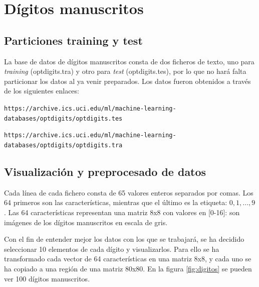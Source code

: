 \documentclass[12pt,spanish]{article} %
\begin{document}

\tableofcontents %

\newpage %

\pagestyle{fancy}


\section{Dígitos manuscritos}

\subsection{Particiones training y test}

La base de datos de dígitos manuscritos consta de dos ficheros de texto, uno para \textit{training} (optdigits.tra) y otro para \textit{test} (optdigits.tes), por lo que no hará falta particionar los datos al ya venir preparados. Los datos fueron obtenidos a través de los siguientes enlaces:

\noindent
{\small \texttt{https://archive.ics.uci.edu/ml/machine-learning-databases/optdigits/optdigits.tes}}

\noindent
{\small \texttt{https://archive.ics.uci.edu/ml/machine-learning-databases/optdigits/optdigits.tra}}

\subsection{Visualización y preprocesado de datos}

Cada línea de cada fichero consta de 65 valores enteros separados por comas. Los 64 primeros son las características, mientras que el último es la etiqueta: $0, 1, ..., 9$. Las 64 características representan una matriz 8x8 con valores en [0-16]: son imágenes de los dígitos manuscritos en escala de gris.

Con el fin de entender mejor los datos con los que se trabajará, se ha decidido seleccionar 10 elementos de cada dígito y visualizarlos. Para ello se ha transformado cada vector de 64 características en una matriz 8x8, y cada uno se ha copiado a una región de una matriz 80x80. En la figura \ref{fig:digitos} se pueden ver 100 dígitos manuscritos.
\end{document}
